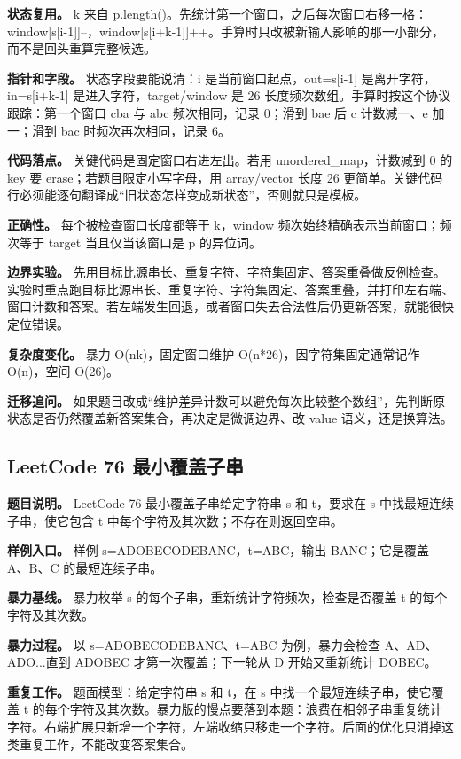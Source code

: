 \textbf{状态复用。} k 来自 p.length()。先统计第一个窗口，之后每次窗口右移一格：window[s[i-1]]--，window[s[i+k-1]]++。手算时只改被新输入影响的那一小部分，而不是回头重算完整候选。

\textbf{指针和字段。} 状态字段要能说清：i 是当前窗口起点，out=s[i-1] 是离开字符，in=s[i+k-1] 是进入字符，target/window 是 26 长度频次数组。手算时按这个协议跟踪：第一个窗口 cba 与 abc 频次相同，记录 0；滑到 bae 后 c 计数减一、e 加一；滑到 bac 时频次再次相同，记录 6。

\textbf{代码落点。} 关键代码是固定窗口右进左出。若用 unordered\_map，计数减到 0 的 key 要 erase；若题目限定小写字母，用 array/vector 长度 26 更简单。关键代码行必须能逐句翻译成“旧状态怎样变成新状态”，否则就只是模板。

\textbf{正确性。} 每个被检查窗口长度都等于 k，window 频次始终精确表示当前窗口；频次等于 target 当且仅当该窗口是 p 的异位词。

\textbf{边界实验。} 先用目标比源串长、重复字符、字符集固定、答案重叠做反例检查。实验时重点跑目标比源串长、重复字符、字符集固定、答案重叠，并打印左右端、窗口计数和答案。若左端发生回退，或者窗口失去合法性后仍更新答案，就能很快定位错误。

\textbf{复杂度变化。} 暴力 O(nk)，固定窗口维护 O(n*26)，因字符集固定通常记作 O(n)，空间 O(26)。

\textbf{迁移追问。} 如果题目改成“维护差异计数可以避免每次比较整个数组”，先判断原状态是否仍然覆盖新答案集合，再决定是微调边界、改 value 语义，还是换算法。

\subsection{LeetCode 76 最小覆盖子串}

\textbf{题目说明。} LeetCode 76 最小覆盖子串给定字符串 s 和 t，要求在 s 中找最短连续子串，使它包含 t 中每个字符及其次数；不存在则返回空串。

\textbf{样例入口。} 样例 s=ADOBECODEBANC，t=ABC，输出 BANC；它是覆盖 A、B、C 的最短连续子串。

\textbf{暴力基线。} 暴力枚举 s 的每个子串，重新统计字符频次，检查是否覆盖 t 的每个字符及其次数。

\textbf{暴力过程。} 以 s=ADOBECODEBANC、t=ABC 为例，暴力会检查 A、AD、ADO...直到 ADOBEC 才第一次覆盖；下一轮从 D 开始又重新统计 DOBEC。

\textbf{重复工作。} 题面模型：给定字符串 s 和 t，在 s 中找一个最短连续子串，使它覆盖 t 的每个字符及其次数。暴力版的慢点要落到本题：浪费在相邻子串重复统计字符。右端扩展只新增一个字符，左端收缩只移走一个字符。后面的优化只消掉这类重复工作，不能改变答案集合。

